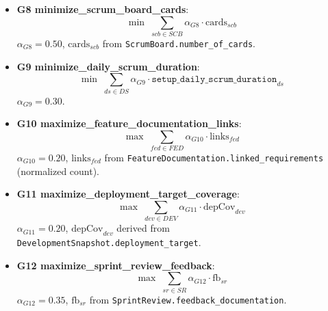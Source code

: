 \documentclass[11pt,a4paper]{article}
\begin{document}
\begin{itemize}[leftmargin=2em]
  \item \textbf{G8 minimize\_scrum\_board\_cards}:
  \[
    \min \; \sum_{scb\in SCB} \alpha_{G8}\cdot \text{cards}_{scb}
  \]
  $\alpha_{G8}=0.50$, $\text{cards}_{scb}$ from \texttt{ScrumBoard.number\_of\_cards}.
  
  \item \textbf{G9 minimize\_daily\_scrum\_duration}:
  \[
    \min \; \sum_{ds\in DS} \alpha_{G9}\cdot \texttt{setup\_daily\_scrum\_duration}_{ds}
  \]
  $\alpha_{G9}=0.30$.
  
  \item \textbf{G10 maximize\_feature\_documentation\_links}:
  \[
    \max \; \sum_{fed\in FED} \alpha_{G10}\cdot \text{links}_{fed}
  \]
  $\alpha_{G10}=0.20$, $\text{links}_{fed}$ from \texttt{FeatureDocumentation.linked\_requirements} (normalized count).
  
  \item \textbf{G11 maximize\_deployment\_target\_coverage}:
  \[
    \max \; \sum_{dev\in DEV} \alpha_{G11}\cdot \text{depCov}_{dev}
  \]
  $\alpha_{G11}=0.20$, $\text{depCov}_{dev}$ derived from \texttt{DevelopmentSnapshot.deployment\_target}.
  
  \item \textbf{G12 maximize\_sprint\_review\_feedback}:
  \[
    \max \; \sum_{sr\in SR} \alpha_{G12}\cdot \text{fb}_{sr}
  \]
  $\alpha_{G12}=0.35$, $\text{fb}_{sr}$ from \texttt{SprintReview.feedback\_documentation}.
\end{itemize}
\end{document}
